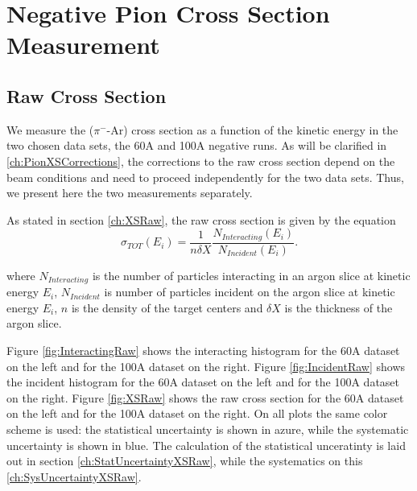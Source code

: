 \chapter{Negative Pion Cross Section Measurement}\label{ch:PionXS}


\section{Raw Cross Section}\label{ch:PionXSRaw}
We measure the ($\pi^-$-Ar) cross section as a function of the kinetic energy in the two chosen data sets, the 60A and 100A negative runs. 
As will be clarified in \ref{ch:PionXSCorrections},  the corrections to the raw cross section depend on the beam conditions and need to proceed independently for the two data sets. Thus, we present here the two measurements separately.


As stated in section \ref{ch:XSRaw},  the raw cross section is given by the equation \label{eq:thinTargetXSSolved}
\begin{equation}
 \sigma_{TOT} (E_i)  = \frac{1}{n \delta X}\frac{N_{Interacting}(E_i)}{N_{Incident}(E_i)}.
\end{equation}

where $N_{Interacting}$  is the number of particles interacting in an argon slice at kinetic energy $E_i$, $N_{Incident}$ is number of particles incident  on the argon slice at   kinetic energy $E_i$,  $n$ is the density of the target centers  and $\delta X$ is the thickness of the argon slice.


Figure \ref{fig:InteractingRaw} shows the interacting histogram for the 60A dataset on the left and for the 100A dataset on the right. 
Figure \ref{fig:IncidentRaw} shows the incident histogram for the 60A dataset on the left and for the 100A dataset on the right. 
Figure \ref{fig:XSRaw} shows the raw cross section for the 60A dataset on the left and for the 100A dataset on the right. On all plots the same color scheme is used: the statistical uncertainty is shown in azure, while the systematic uncertainty is shown in blue. The calculation of the statistical unceratinty is laid out in section \ref{ch:StatUncertaintyXSRaw}, while the systematics on this \ref{ch:SysUncertaintyXSRaw}.

